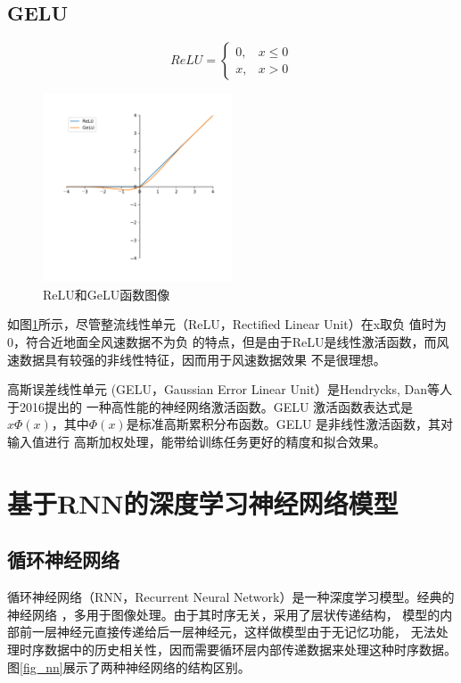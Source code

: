 \documentclass[AutoFakeBold]{LZUThesis}
\begin{document}
\subsection{GELU}
$$
ReLU=
\left\{\begin{matrix}
    0, & x \leq 0 \\
    x, & x > 0
\end{matrix}\right.
$$

\begin{figure}[H]
	\centering
    \includegraphics[width=0.5\textwidth]{figures/relu_gelu.pdf}
    \caption{ReLU和GeLU函数图像}
    \label{fig_relu_gelu}
\end{figure}

如图\ref{fig_relu_gelu}所示，尽管整流线性单元（ReLU，Rectified Linear Unit）在x取负
值时为0，符合近地面全风速数据不为负
的特点，但是由于ReLU是线性激活函数，而风速数据具有较强的非线性特征，因而用于风速数据效果
不是很理想。

高斯误差线性单元 (GELU，Gaussian Error Linear Unit）是Hendrycks, Dan等人于2016提出的
\cite{hendrycks2016gaussian}一种高性能的神经网络激活函数。GELU 激活函数表达式是
$x\Phi(x)$，其中$\Phi(x)$是标准高斯累积分布函数。GELU 是非线性激活函数，其对输入值进行
高斯加权处理，能带给训练任务更好的精度和拟合效果。

\section{基于RNN的深度学习神经网络模型}
\subsection{循环神经网络}
循环神经网络（RNN，Recurrent Neural Network）是一种深度学习模型。经典的神经网络
\cite{rumelhart1986learning}，多用于图像处理。由于其时序无关，采用了层状传递结构，
模型的内部前一层神经元直接传递给后一层神经元，这样做模型由于无记忆功能，
无法处理时序数据中的历史相关性，因而需要循环层内部传递数据来处理这种时序数据。
图\ref{fig_nn}展示了两种神经网络的结构区别。
\end{document}
